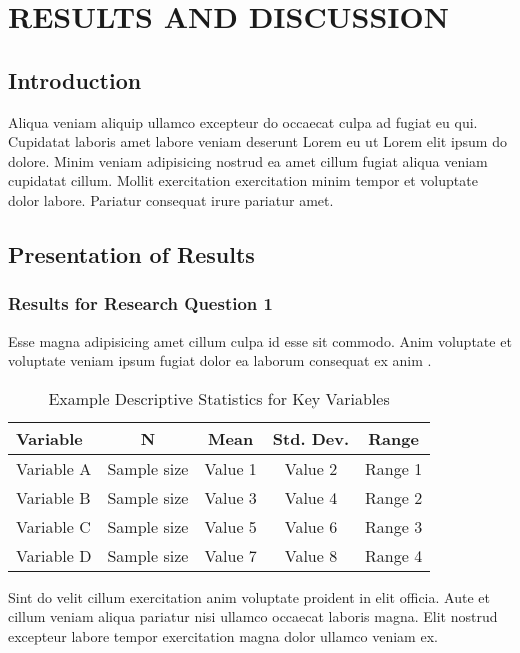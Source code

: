 \chapter{RESULTS AND DISCUSSION}

\section{Introduction}

Aliqua veniam aliquip ullamco excepteur do occaecat culpa ad fugiat eu qui. Cupidatat laboris amet labore veniam deserunt Lorem eu ut Lorem elit ipsum do dolore. Minim veniam adipisicing nostrud ea amet cillum fugiat aliqua veniam cupidatat cillum. Mollit exercitation exercitation minim tempor et voluptate dolor labore. Pariatur consequat irure pariatur amet.

\section{Presentation of Results}

\subsection{Results for Research Question 1}

Esse magna adipisicing amet cillum culpa id esse sit commodo. Anim voluptate et voluptate veniam ipsum fugiat dolor ea laborum consequat ex anim \parencite{placeholderArticle2023}.

\begin{table}[ht]
  \centering
  \caption{Example Descriptive Statistics for Key Variables}
  \label{tab:example_descriptives}
  \begin{tabular}{lcccc}
    \hline\hline
    \textbf{Variable} & \textbf{N} & \textbf{Mean} & \textbf{Std. Dev.} & \textbf{Range} \\
    \hline
    Variable A & Sample size & Value 1 & Value 2 & Range 1 \\
    Variable B & Sample size & Value 3 & Value 4 & Range 2 \\
    Variable C & Sample size & Value 5 & Value 6 & Range 3 \\
    Variable D & Sample size & Value 7 & Value 8 & Range 4 \\
    \hline\hline
  \end{tabular}
\end{table}

Sint do velit cillum exercitation anim voluptate proident in elit officia. Aute et cillum veniam aliqua pariatur nisi ullamco occaecat laboris magna. Elit nostrud excepteur labore tempor exercitation magna dolor ullamco veniam ex.

